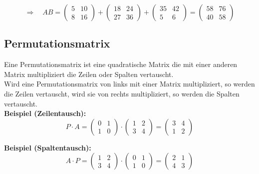 \documentclass[12pt,a4paper]{article}
\begin{document}
\[
\Rightarrow
\quad
AB =
\begin{pmatrix}
    5 & 10 \\
    8 & 16
\end{pmatrix}
+
\begin{pmatrix}
    18 & 24 \\
    27 & 36
\end{pmatrix}
+
\begin{pmatrix}
    35 & 42 \\
    5 & 6
\end{pmatrix}
=
\begin{pmatrix}
    58 & 76 \\
    40 & 58
\end{pmatrix}
\]

\subsection{Permutationsmatrix}
Eine Permutationsmatrix ist eine quadratische Matrix die mit einer anderen Matrix multipliziert die Zeilen oder Spalten vertauscht. \\
Wird eine Permutationsmatrix von links mit einer Matrix multipliziert, so werden die Zeilen vertauscht, wird sie von rechts multipliziert, so werden die Spalten vertauscht. \\
\textbf{Beispiel (Zeilentausch):}
\[
P \cdot A
=
\begin{pmatrix}
0 & 1 \\
1 & 0
\end{pmatrix}
\cdot
\begin{pmatrix}
1 & 2 \\
3 & 4
\end{pmatrix}
=
\begin{pmatrix}
3 & 4 \\
1 & 2
\end{pmatrix}
\]

\textbf{Beispiel (Spaltentausch):}
\[
A \cdot P
=
\begin{pmatrix}
1 & 2 \\
3 & 4
\end{pmatrix}
\cdot
\begin{pmatrix}
0 & 1 \\
1 & 0
\end{pmatrix}
=
\begin{pmatrix}
2 & 1 \\
4 & 3
\end{pmatrix}
\]
\end{document}
